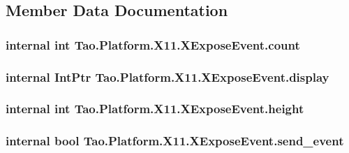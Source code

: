 \subsection{Member Data Documentation}
\hypertarget{struct_tao_1_1_platform_1_1_x11_1_1_x_expose_event_aed934096f871a622d2d313840907d4f2}{
\subsubsection[{count}]{\setlength{\rightskip}{0pt plus 5cm}internal int {\bf Tao.Platform.X11.XExposeEvent.count}}}
\label{struct_tao_1_1_platform_1_1_x11_1_1_x_expose_event_aed934096f871a622d2d313840907d4f2}
\hypertarget{struct_tao_1_1_platform_1_1_x11_1_1_x_expose_event_a909f7261d6c421106c10f2281c3d28cc}{
\subsubsection[{display}]{\setlength{\rightskip}{0pt plus 5cm}internal IntPtr {\bf Tao.Platform.X11.XExposeEvent.display}}}
\label{struct_tao_1_1_platform_1_1_x11_1_1_x_expose_event_a909f7261d6c421106c10f2281c3d28cc}
\hypertarget{struct_tao_1_1_platform_1_1_x11_1_1_x_expose_event_adfb7c26d8f6ce9a49e7392ffde2f9012}{
\subsubsection[{height}]{\setlength{\rightskip}{0pt plus 5cm}internal int {\bf Tao.Platform.X11.XExposeEvent.height}}}
\label{struct_tao_1_1_platform_1_1_x11_1_1_x_expose_event_adfb7c26d8f6ce9a49e7392ffde2f9012}
\hypertarget{struct_tao_1_1_platform_1_1_x11_1_1_x_expose_event_acb7420b836cfa08e1d8a6534db045e03}{
\subsubsection[{send\_\-event}]{\setlength{\rightskip}{0pt plus 5cm}internal bool {\bf Tao.Platform.X11.XExposeEvent.send\_\-event}}}
